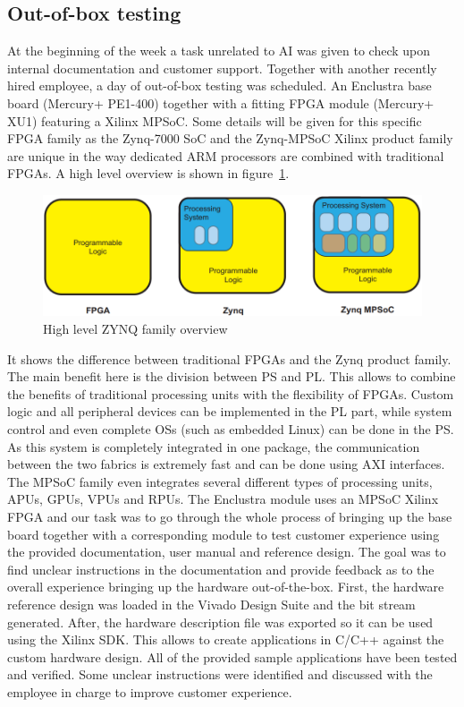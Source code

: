 \subsection{Out-of-box testing}
At the beginning of the week a task unrelated to \ac{AI} was given to check upon internal documentation and customer support. Together with another recently hired employee, a day of out-of-box testing was scheduled. An Enclustra base board (Mercury+ PE1-400) together with a fitting \ac{FPGA} module (Mercury+ XU1) featuring a Xilinx \ac{MPSoC}.
Some details will be given for this specific \ac{FPGA} family as the Zynq-7000 \ac{SoC} and the Zynq-\ac{MPSoC} Xilinx product family are unique in the way dedicated ARM processors are combined with traditional \acp{FPGA}. A high level overview is shown in figure~\ref{fig:zynq-overview}.
\begin{figure}[!htb]
	\centering
		\includegraphics[width=\textwidth]{bilder/ZYNQ-overview.png}
		\caption{High level ZYNQ family overview~\cite{zynq-book}}
		\label{fig:zynq-overview}
\end{figure}
It shows the difference between traditional \acp{FPGA} and the Zynq product family. The main benefit here is the division between \ac{PS} and \ac{PL}. This allows to combine the benefits of traditional processing units with the flexibility of \acp{FPGA}. Custom logic and all peripheral devices can be implemented in the \ac{PL} part, while system control and even complete \acp{OS} (such as embedded Linux) can be done in the \ac{PS}. As this system is completely integrated in one package, the communication between the two fabrics is extremely fast and can be done using \ac{AXI} interfaces. The \ac{MPSoC} family even integrates several different types of processing units, \acp{APU}, \acp{GPU}, \acp{VPU} and \acp{RPU}.
The Enclustra module uses an \ac{MPSoC} Xilinx FPGA and our task was to go through the whole process of bringing up the base board together with a corresponding module to test customer experience using the provided documentation, user manual and reference design. The goal was to find unclear instructions in the documentation and provide feedback as to the overall experience bringing up the hardware out-of-the-box. First, the hardware reference design was loaded in the Vivado Design Suite and the bit stream generated. After, the hardware description file was exported so it can be used using the Xilinx \ac{SDK}. This allows to create applications in C/C++ against the custom hardware design. All of the provided sample applications have been tested and verified. Some unclear instructions were identified and discussed with the employee in charge to improve customer experience.
